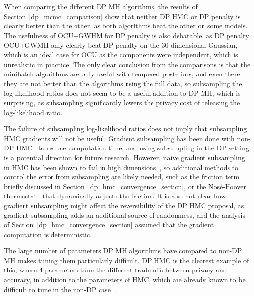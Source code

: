 \documentclass[english,twoside,openright]{HYgraduMLDS}
\begin{document}
When comparing the different DP MH algorithms, the results of
Section~\ref{dp_mcmc_comparison} show that neither DP HMC or DP penalty is
clearly better than the other, as both algorithms beat the other on some models.
The usefulness of OCU+GWHM for DP penalty is also debatable, as DP penalty
OCU+GWMH only clearly beat DP penalty on the 30-dimensional Gaussian, which
is an ideal case for OCU as the components were independent, which is unrealistic in
practice. The only
clear conclusion from the comparisons is that the minibatch algorithms are
only useful with tempered posteriors, and even there they are not better
than the algorithms using the full data, so subsampling the log-likelihood ratios
does not seem to be a useful addition to DP MH, which is surprising, as
subsampling significantly lowers the privacy cost of releasing the log-likelihood
ratio.

The failure of subsampling log-likelihood ratios does not imply that subsampling
HMC gradients will not be useful. Gradient subsampling has been done with
non-DP HMC~\cite{CFG14, DFB14} to reduce computation time, and using subsampling
in the DP setting is a potential direction for future research. However,
naive gradient subsampling in HMC has been shown to fail in high
dimensions~\cite{Bet15}, so additional methods to control the error from subsampling
are likely needed, such as the friction term~\cite{CFG14} briefly discussed in
Section~\ref{dp_hmc_convergence_section}, or the Nosé-Hoover thermostat~\cite{DFB14} that
dynamically adjusts the friction. It is also not clear how gradient subsampling
might affect the reversibility of the DP HMC proposal, as gradient subsampling
adds an additional source of randomness, and the analysis of
Section~\ref{dp_hmc_convergence_section} assumed that the gradient computation
is deterministic.

The large number of parameters DP MH algorithms have compared to non-DP
MH makes tuning them particularly difficult. DP HMC is the clearest example
of this, where 4 parameters tune the different trade-offs between privacy and
accuracy, in addition to the parameters of HMC, which are already known to
be difficult to tune in the non-DP case~\cite{neal2012mcmc}.
\end{document}
